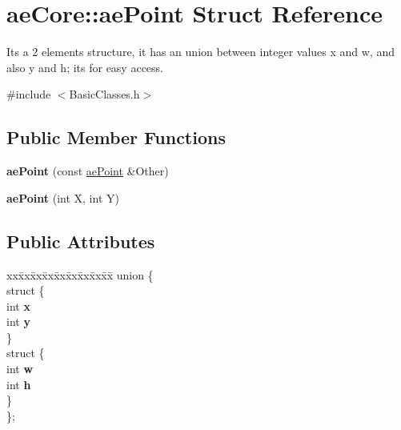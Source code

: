 \hypertarget{structae_core_1_1ae_point}{}\section{ae\+Core\+:\+:ae\+Point Struct Reference}
\label{structae_core_1_1ae_point}


It\textquotesingle{}s a 2 elements structure, it has an union between integer values x and w, and also y and h; it\textquotesingle{}s for easy access.  




{\ttfamily \#include $<$Basic\+Classes.\+h$>$}

\subsection*{Public Member Functions}
\begin{DoxyCompactItemize}
\item 
{\bfseries ae\+Point} (const \hyperlink{structae_core_1_1ae_point}{ae\+Point} \&Other)\hypertarget{structae_core_1_1ae_point_ac80be6903e68ecc4c168d98987c2d989}{}\label{structae_core_1_1ae_point_ac80be6903e68ecc4c168d98987c2d989}

\item 
{\bfseries ae\+Point} (int X, int Y)\hypertarget{structae_core_1_1ae_point_aebb984a4502e4d670dadc214e3541488}{}\label{structae_core_1_1ae_point_aebb984a4502e4d670dadc214e3541488}

\end{DoxyCompactItemize}
\subsection*{Public Attributes}
\begin{DoxyCompactItemize}
\item 
\begin{tabbing}
xx\=xx\=xx\=xx\=xx\=xx\=xx\=xx\=xx\=\kill
union \{\\
\>struct \{\\
\>\>int {\bfseries x}\\
\>\>int {\bfseries y}\\
\>\} \hypertarget{unionae_core_1_1ae_point_1_1_0D0_ab375d2cd78e5102c8b9ab65f06a8b4c9}{}\label{unionae_core_1_1ae_point_1_1_0D0_ab375d2cd78e5102c8b9ab65f06a8b4c9}
\\
\>struct \{\\
\>\>int {\bfseries w}\\
\>\>int {\bfseries h}\\
\>\} \hypertarget{unionae_core_1_1ae_point_1_1_0D0_a3282ec6603c4c243656021cfa7ddb914}{}\label{unionae_core_1_1ae_point_1_1_0D0_a3282ec6603c4c243656021cfa7ddb914}
\\
\}; \hypertarget{structae_core_1_1ae_point_aa9c2b049ab3cf5115115f411c1486296}{}\label{structae_core_1_1ae_point_aa9c2b049ab3cf5115115f411c1486296}
\\

\end{tabbing}\end{DoxyCompactItemize}


